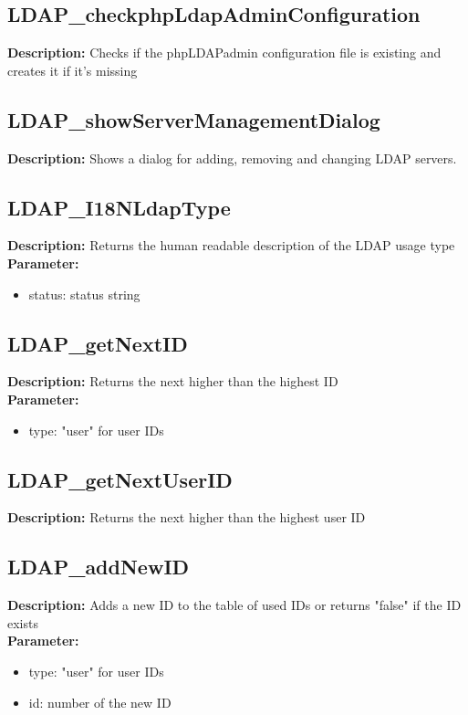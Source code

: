 \subsection{LDAP\_checkphpLdapAdminConfiguration}
\textbf{Description:} Checks if the phpLDAPadmin configuration file is existing and creates it if it's missing\\

\subsection{LDAP\_showServerManagementDialog}
\textbf{Description:} Shows a dialog for adding, removing and changing LDAP servers.\\

\subsection{LDAP\_I18NLdapType}
\textbf{Description:} Returns the human readable description of the LDAP usage type \\
\textbf{Parameter:}
\begin{itemize}
\item status: status string
\end{itemize}

\subsection{LDAP\_getNextID}
\textbf{Description:} Returns the next higher than the highest ID\\
\textbf{Parameter:}
\begin{itemize}
\item type: "user" for user IDs
\end{itemize}

\subsection{LDAP\_getNextUserID}
\textbf{Description:} Returns the next higher than the highest user ID\\

\subsection{LDAP\_addNewID}
\textbf{Description:} Adds a new ID to the table of used IDs or returns "false" if the ID exists\\
\textbf{Parameter:}
\begin{itemize}
\item type: "user" for user IDs
\item id: number of the new ID
\end{itemize}

